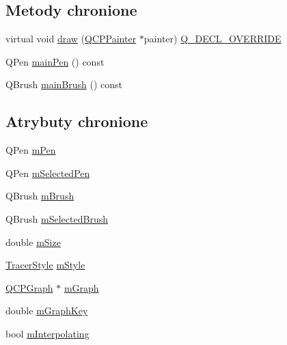 \subsection*{Metody chronione}
\begin{DoxyCompactItemize}
\item 
virtual void \hyperlink{class_q_c_p_item_tracer_a11f187ffea436434f3b5cfc387811967}{draw} (\hyperlink{class_q_c_p_painter}{Q\+C\+P\+Painter} $\ast$painter) \hyperlink{qcustomplot_8hh_a42cc5eaeb25b85f8b52d2a4b94c56f55}{Q\+\_\+\+D\+E\+C\+L\+\_\+\+O\+V\+E\+R\+R\+I\+DE}
\item 
Q\+Pen \hyperlink{class_q_c_p_item_tracer_af87132b7698d5bb35c96a8a0b9e7180e}{main\+Pen} () const 
\item 
Q\+Brush \hyperlink{class_q_c_p_item_tracer_aaf4e72e2d87f53279b9f9ba624961bf5}{main\+Brush} () const 
\end{DoxyCompactItemize}
\subsection*{Atrybuty chronione}
\begin{DoxyCompactItemize}
\item 
Q\+Pen \hyperlink{class_q_c_p_item_tracer_a579e3bd6bd16d6aaff03638dc8a99a69}{m\+Pen}
\item 
Q\+Pen \hyperlink{class_q_c_p_item_tracer_a3f61829784200819661d1e2a5354d866}{m\+Selected\+Pen}
\item 
Q\+Brush \hyperlink{class_q_c_p_item_tracer_a6597be63a17a266233941354200b2340}{m\+Brush}
\item 
Q\+Brush \hyperlink{class_q_c_p_item_tracer_a1c15d2adde40efdcc0ef1ff78fd256a6}{m\+Selected\+Brush}
\item 
double \hyperlink{class_q_c_p_item_tracer_a575153a24bb357d1e006f6bc3bd099b9}{m\+Size}
\item 
\hyperlink{class_q_c_p_item_tracer_a2f05ddb13978036f902ca3ab47076500}{Tracer\+Style} \hyperlink{class_q_c_p_item_tracer_afb1f236bebf417544e0138fef22a292e}{m\+Style}
\item 
\hyperlink{class_q_c_p_graph}{Q\+C\+P\+Graph} $\ast$ \hyperlink{class_q_c_p_item_tracer_a2d70cf616b579563aa15f796dfc143ac}{m\+Graph}
\item 
double \hyperlink{class_q_c_p_item_tracer_a8fa20f2e9ee07d21fd7c8d30ba4702ca}{m\+Graph\+Key}
\item 
bool \hyperlink{class_q_c_p_item_tracer_afab37c22ad39f235921e86f93cd84595}{m\+Interpolating}
\end{DoxyCompactItemize}
